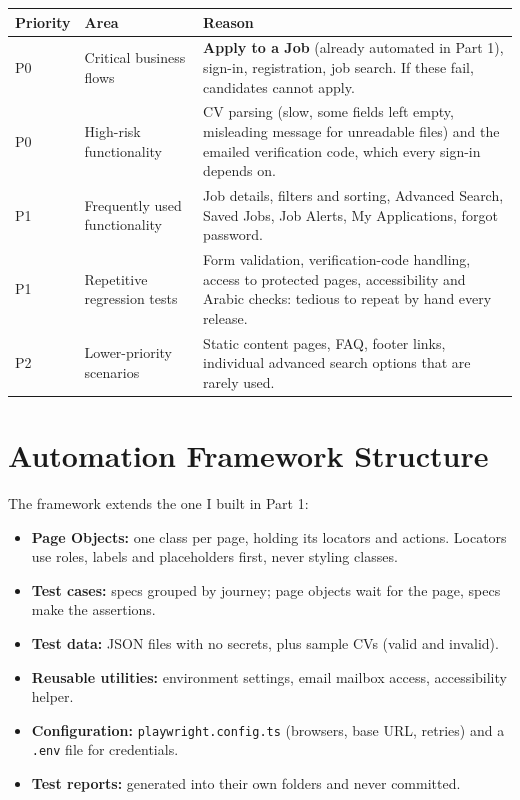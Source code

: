 \documentclass[11pt,a4paper]{article}
\begin{document}
\begin{tabularx}{\linewidth}{@{}l L{4.2cm} Y@{}}
\toprule
\textbf{Priority} & \textbf{Area} & \textbf{Reason} \\
\midrule
P0 & Critical business flows & \textbf{Apply to a Job} (already automated in Part 1), sign-in, registration, job
search. If these fail, candidates cannot apply. \\
P0 & High-risk functionality & CV parsing (slow, some fields left empty, misleading message for unreadable files)
and the emailed verification code, which every sign-in depends on. \\
P1 & Frequently used functionality & Job details, filters and sorting, Advanced Search, Saved Jobs, Job Alerts,
My Applications, forgot password. \\
P1 & Repetitive regression tests & Form validation, verification-code handling, access to protected pages,
accessibility and Arabic checks: tedious to repeat by hand every release. \\
P2 & Lower-priority scenarios & Static content pages, FAQ, footer links, individual advanced search options that are rarely used. \\
\bottomrule
\end{tabularx}

\section{Automation Framework Structure}

The framework extends the one I built in Part 1:
\begin{itemize}
  \item \textbf{Page Objects:} one class per page, holding its locators and actions. Locators use roles, labels and
        placeholders first, never styling classes.
  \item \textbf{Test cases:} specs grouped by journey; page objects wait for the page, specs make the assertions.
  \item \textbf{Test data:} JSON files with no secrets, plus sample CVs (valid and invalid).
  \item \textbf{Reusable utilities:} environment settings, email mailbox access, accessibility helper.
  \item \textbf{Configuration:} \texttt{playwright.config.ts} (browsers, base URL, retries) and a \texttt{.env} file for credentials.
  \item \textbf{Test reports:} generated into their own folders and never committed.
\end{itemize}
\end{document}
